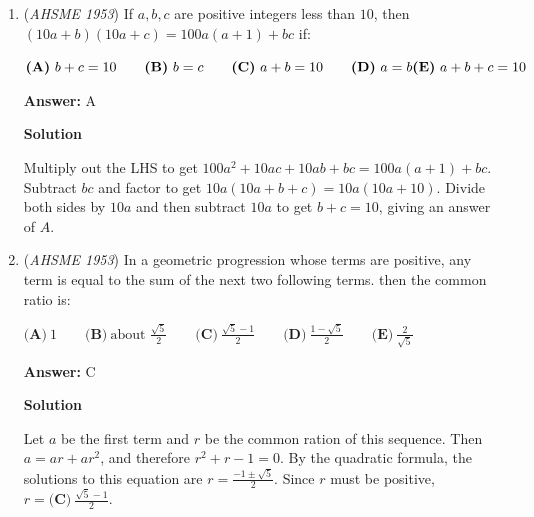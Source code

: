 \begin{enumerate}
 The equation $\sqrt{x+10} = 6$ has a real solution of $x = 26$, while $\sqrt{x+10} = -1$ has an extraneous solution of $x = -9$.  Therefore, the correct answer is $\boxed{\textbf{(B)}\ \text{an extraneous root between }-10\text{ and }-6}$.

 



\textbf{Solution 2}

We can multiply both sides by $\sqrt{x+10}$ to get $x+4=5\sqrt{x+10}$. We can now square both sides to get $x^2+8x+16=25x+250$, which yields $x^2-17x-234=0$. We can factor the quadratic as $(x+9)(x-26)=0$, giving us roots of $-9$ and $26$. Plugging in these values, we find that $-9$ is an extraneous root and $26$ is a true root. This gives us the final answer of $\boxed{\textbf{(B)}\ \text{an extraneous root between }-10\text{ and }-6}$.

 


	\item (\textit{AHSME 1953}) If $a,b,c$ are positive integers less than $10$, then $(10a + b)(10a + c) = 100a(a + 1) + bc$ if: 


 $\textbf{(A)}\ b + c = 10 \qquad \textbf{(B)}\ b = c \qquad \textbf{(C)}\ a + b = 10 \qquad \textbf{(D)}\ a = b \\  \textbf{(E)}\ a+b+c = 10$

 \textbf{Answer: }A



\textbf{Solution}

Multiply out the LHS to get $100a^2+10ac+10ab+bc=100a(a+1)+bc$. Subtract $bc$ and factor to get $10a(10a+b+c)=10a(10a+10)$. Divide both sides by $10a$ and then subtract $10a$ to get $b+c=10$, giving an answer of $\boxed{A}$.

 


	\item (\textit{AHSME 1953}) In a geometric progression whose terms are positive, any term is equal to the sum of the next two following terms. then the common ratio is: 


 $\textbf{(A)}\ 1 \qquad \textbf{(B)}\ \text{about }\frac{\sqrt{5}}{2} \qquad \textbf{(C)}\ \frac{\sqrt{5}-1}{2}\qquad \textbf{(D)}\ \frac{1-\sqrt{5}}{2}\qquad \textbf{(E)}\ \frac{2}{\sqrt{5}}$

 \textbf{Answer: }C



\textbf{Solution}

Let $a$ be the first term and $r$ be the common ration of this sequence. Then $a=ar+ar^2$, and therefore $r^2+r-1=0$. By the quadratic formula, the solutions to this equation are $r = \frac{-1\pm\sqrt{5}}{2}$.  Since $r$ must be positive, $r = \boxed{\textbf{(C)}\ \frac{\sqrt{5}-1}{2}}$.


\end{enumerate}

